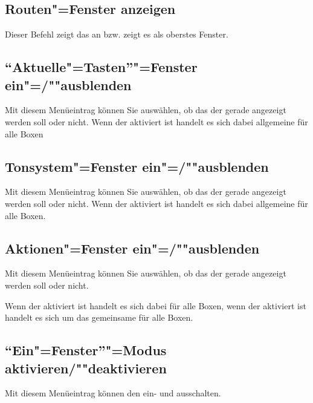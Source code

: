 \subsection{Routen"=Fenster anzeigen}\label{sec:MI_ROUTES}


Dieser Befehl zeigt das  an bzw. 
zeigt es als oberstes Fenster.


\subsection{"`Aktuelle"=Tasten"'"=Fenster ein"=/""ausblenden}\label{sec:MI_KEY}
Mit diesem Menüeintrag können Sie auswählen, ob das
 der gerade
 angezeigt werden soll oder
nicht. Wenn der 
aktiviert ist handelt es sich dabei allgemeine
 für alle Boxen


\subsection{Tonsystem"=Fenster 
ein"=/""ausblenden}
\label{sec:MI_TS}
Mit diesem Menüeintrag können Sie auswählen, ob das
 der gerade
 angezeigt werden soll oder
nicht. Wenn der 
aktiviert ist handelt es sich dabei allgemeine
 für alle Boxen.


\subsection{Aktionen"=Fenster ein"=/""ausblenden}
\label{sec:MI_ACTION}

Mit diesem Menüeintrag können Sie auswählen, ob das
 der gerade
 angezeigt werden soll oder
nicht.


Wenn der  aktiviert 
ist handelt es sich dabei  für 
alle Boxen, wenn der 
aktiviert ist handelt es sich um das gemeinsame  
für alle Boxen.


\subsection{"`Ein"=Fenster"'"=Modus aktivieren/""deaktivieren}
\label{sec:MI_OWM}
Mit diesem Menüeintrag können den 
ein- und ausschalten.


